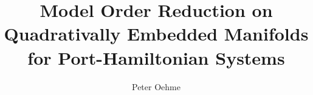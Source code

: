 

\title{Model Order Reduction on Quadrativally Embedded Manifolds for Port-Hamiltonian Systems}
\author{Peter Oehme}


    \maketitle

    

    \tableofcontents

    

    \printbibliography[
        heading=bibintoc,
        title={Bibliography}
    ]

